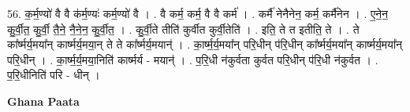 \documentclass[17pt]{extarticle}
\begin{document}
56. क॒र्म॒ण्यो॑ वै वै क॑र्म॒ण्यः॑ कर्म॒ण्यो॑ वै । . वै कर्म॒ कर्म॒ वै वै कर्म॑ । . कर्मै॑ नेनैनेन॒ कर्म॒ कर्मै॑नेन । . ए॒ने॒न॒ कु॒र्वी॒त॒ कु॒र्वी॒ तै॒ने॒ नै॒ने॒न॒ कु॒र्वी॒त॒ । . कु॒र्वी॒ते तीति॑ कुर्वीत कुर्वी॒तेति॑ । . इति॒ ते त इतीति॒ ते । . ते का᳚र्ष्मर्य॒मया᳚न् कार्ष्मर्य॒मया॒न् ते ते का᳚र्ष्मर्य॒मयान्॑ । . का॒र्ष्म॒र्य॒मया᳚न् परि॒धीन् प॑रि॒धीन् का᳚र्ष्मर्य॒मया᳚न् कार्ष्मर्य॒मया᳚न् परि॒धीन् । . का॒र्ष्म॒र्य॒मया॒निति॑ कार्ष्मर्य - मयान्॑ । . प॒रि॒धी न॑कुर्वता कुर्वत परि॒धीन् प॑रि॒धी न॑कुर्वत । . प॒रि॒धीनिति॑ परि - धीन् । \newline

\textbf{Ghana Paata } \newline
\end{document}
